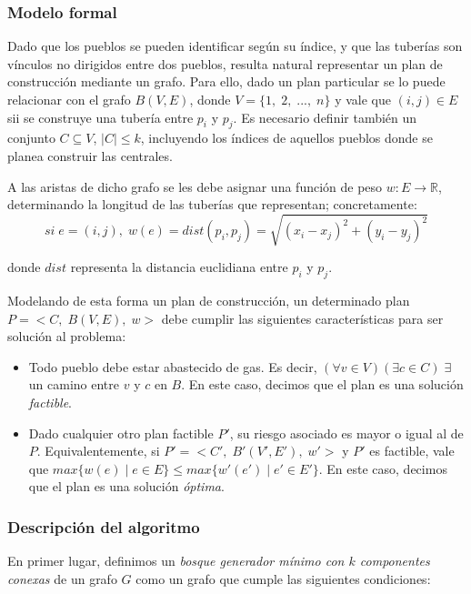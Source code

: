 \subsubsection{Modelo formal}

Dado que los pueblos se pueden identificar según su índice, y que las tuberías son vínculos no dirigidos entre dos pueblos, resulta natural representar un plan de construcción mediante un grafo. Para ello, dado un plan particular se lo puede relacionar con el grafo $B(V, E)$, donde $V = \{1,\;2,\;...,\;n\}$ y vale que $(i,j) \in E$ sii se construye una tubería entre $p_i$ y $p_j$. Es necesario definir también un conjunto $C \subseteq V$, $|C| \leq k$, incluyendo los índices de aquellos pueblos donde se planea construir las centrales.

A las aristas de dicho grafo se les debe asignar una función de peso $w:E\rightarrow\mathbb{R}$, determinando la longitud de las tuberías que representan; concretamente:
$$si\;e = (i,j),\;w(e) = dist(p_i,p_j) = \sqrt{(x_i - x_j)^2 + (y_i - y_j)^2}$$

donde $dist$ representa la distancia euclidiana entre $p_i$ y $p_j$.

Modelando de esta forma un plan de construcción, un determinado plan $P = <C,\;B(V, E),\;w>$ debe cumplir las siguientes características para ser solución al problema:

\begin{itemize}
  \item Todo pueblo debe estar abastecido de gas. Es decir, $(\forall v \in V)(\exists c \in C)\;\exists$ un camino entre $v$ y $c$ en $B$. En este caso, decimos que el plan es una solución \emph{factible}.
  
  \item Dado cualquier otro plan factible $P'$, su riesgo asociado es mayor o igual al de $P$. Equivalentemente, si $P' = <C',\;B'(V', E'),\;w'>$ y $P'$ es factible, vale que $max\{w(e)\;|\;e\in E\} \leq max\{w'(e')\;|\;e'\in E'\}$. En este caso, decimos que el plan es una solución \emph{óptima}.
\end{itemize}

\subsubsection{Descripción del algoritmo}

En primer lugar, definimos un \emph{bosque generador mínimo con $k$ componentes conexas} de un grafo $G$ como un grafo que cumple las siguientes condiciones:

